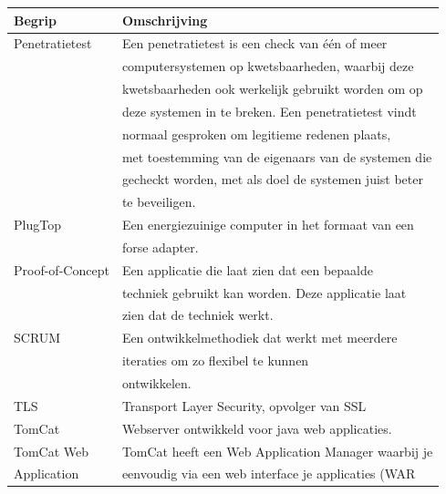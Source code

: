 \documentclass[]{article}
\begin{document}
\begin{tabular}{|| l | l ||}\hline
    Begrip           & Omschrijving                                         \\\hline\hline
    Penetratietest   & Een penetratietest is een check van \'e\'en of meer  \\
                     & computersystemen op kwetsbaarheden, waarbij deze     \\
                     & kwetsbaarheden ook werkelijk gebruikt worden om op   \\
                     & deze systemen in te breken. Een penetratietest vindt \\
                     & normaal gesproken om legitieme redenen plaats,       \\
                     & met toestemming van de eigenaars van de systemen die \\
                     & gecheckt worden, met als doel de systemen juist beter\\
                     & te beveiligen.                                       \\\hline
    PlugTop          & Een energiezuinige computer in het formaat van een   \\
                     & forse adapter.                                       \\\hline
    Proof-of-Concept & Een applicatie die laat zien dat een bepaalde        \\
                     & techniek gebruikt kan worden. Deze applicatie laat   \\
                     & zien dat de techniek werkt.                          \\\hline
    SCRUM            & Een ontwikkelmethodiek dat werkt met meerdere        \\
                     & iteraties om zo flexibel te kunnen                   \\
                     & ontwikkelen.                                         \\\hline
    TLS              & Transport Layer Security, opvolger van SSL           \\\hline    
    TomCat           & Webserver ontwikkeld voor java web applicaties.      \\\hline
    TomCat Web       & TomCat heeft een Web Application Manager waarbij je  \\
    Application      & eenvoudig via een web interface je applicaties (WAR  \\

\end{tabular}
\end{document}
